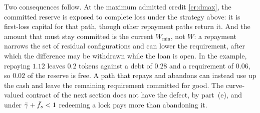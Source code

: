 Two consequences follow. At the maximum admitted credit \eqref{cr:dmax}, the committed reserve is exposed to complete loss under the strategy above: it is first-loss capital for that path, though other repayment paths return it. And the amount that must stay committed is the current $W_{\min}$, not $W$: a repayment narrows the set of residual configurations and can lower the requirement, after which the difference may be withdrawn while the loan is open. In the example, repaying $1.12$ leaves $0.2$ tokens against a debt of $0.28$ and a requirement of $0.06$, so $0.02$ of the reserve is free. A path that repays and abandons can instead use up the cash and leave the remaining requirement committed for good. The curve-valued contract of the next section does not have the defect, by part~(e), and under $\bar\gamma+\bar f_s<1$ redeeming a lock pays more than abandoning it.

